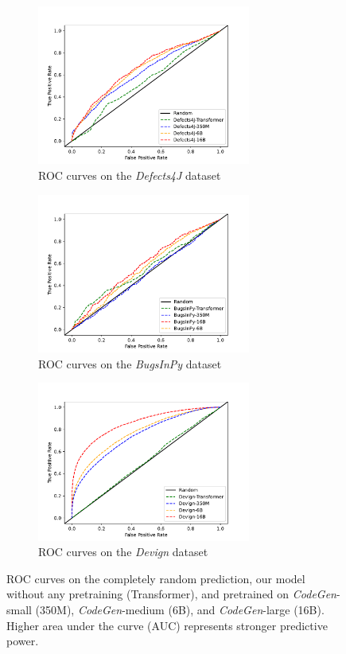 \documentclass[12pt,openany,oneside,table]{cmuthesis}
\begin{document}
\begin{figure}
\centering
     \begin{subfigure}{}
         \centering
         \includegraphics[width=7cm]{figures/roc/defects4j_roc.pdf}
         \caption{ROC curves on the \textit{Defects4J} dataset}
         \label{roc:defects4j}
     \end{subfigure}
     \begin{subfigure}{}
         \centering
         \includegraphics[width=7cm]{figures/roc/bugsinpy_roc.pdf}
         \caption{ROC curves on the \textit{BugsInPy} dataset}
         \label{roc:bugsinpy}
     \end{subfigure}
     \begin{subfigure}{}
         \centering
         \includegraphics[width=7cm]{figures/roc/devign_roc.pdf}
         \caption{ROC curves on the \textit{Devign} dataset}
         \label{roc:devign}
     \end{subfigure}
\label{fig:roc}
\vspace{-2mm}
\caption{ROC curves on the completely random prediction, our model without any pretraining (Transformer), and pretrained on \textit{CodeGen}-small (350M), \textit{CodeGen}-medium (6B), and \textit{CodeGen}-large (16B). Higher area under the curve (AUC) represents stronger predictive power.}
\end{figure}
\end{document}
